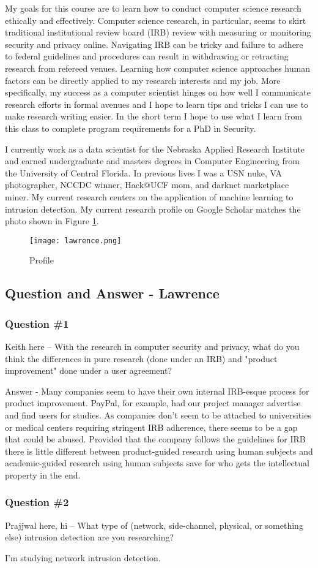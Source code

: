 My goals for this course are to learn how to conduct computer science research ethically and effectively. Computer science research, in particular, seems to skirt traditional institutional review board (IRB) review with measuring or monitoring security and privacy online. Navigating IRB can be tricky and failure to adhere to federal guidelines and procedures can result in withdrawing or retracting research from refereed venues. Learning how computer science approaches human factors can be directly applied to my research interests and my job. More specifically, my success as a computer scientist hinges on how well I communicate research efforts in formal avenues and I hope to learn tips and tricks I can use to make research writing easier. In the short term I hope to use what I learn from this class to complete program requirements for a PhD in Security.

I currently work as a data scientist for the Nebraska Applied Research Institute and earned undergraduate and masters degrees in Computer Engineering from the University of Central Florida. In previous lives I was a USN nuke, VA photographer, NCCDC winner, Hack@UCF mom, and darknet marketplace miner. My current research centers on the application of machine learning to intrusion detection. My current research profile on Google Scholar matches the photo shown in Figure \ref{fig:profile}.

\begin{figure}[h!]
   \centering
    \texttt{[image: lawrence.png]}
    \caption{Profile}
    \label{fig:profile}
\end{figure}

\subsection{Question and Answer - Lawrence}
\subsubsection{Question \#1}
Keith here -- With the research in computer security and privacy, what do you think the differences in pure research (done under an IRB) and "product improvement" done under a user agreement?

Answer - Many companies seem to have their own internal IRB-esque process for product improvement. PayPal, for example, had our project manager advertise and find users for studies. As companies don't seem to be attached to universities or medical centers requiring stringent IRB adherence, there seems to be a gap that could be abused. Provided that the company follows the guidelines for IRB there is little different between product-guided research using human subjects and academic-guided research using human subjects save for who gets the intellectual property in the end.

\subsubsection{Question \#2}
Prajjwal here, hi -- What type of (network, side-channel, physical, or something else) intrusion detection are
you researching?

I'm studying network intrusion detection.
